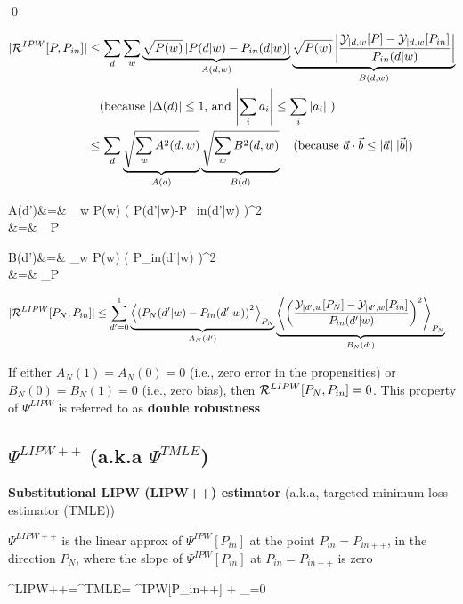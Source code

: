 \qed


\begin{align}
|{\cal R}^{IPW}[P,P_{in}]|&\leq
\sum_d \sum_w
\underbrace{\sqrt{P(w)}
\left|
P(d|w)-P_{in}(d|w)
\right|}_{A(d,w)}
\underbrace{\sqrt{P(w)}
\left|
\frac{
{\cal Y}_{|d,w}[P]-{\cal Y}_{|d,w}[P_{in}]}
{P_{in}(d|w)}
\right|}_{B(d,w)}
\nonumber
\\&
\quad\text{(because
$|\Delta(d)|\leq 1$, and $\left|\sum_i a_i\right|\leq \sum_i |a_i|$ )}
\\
&\leq
\sum_d
\underbrace{\sqrt{\sum_w A^2(d,w)}}_{A(d)}
\underbrace{\sqrt{\sum_w B^2(d,w)}}_{B(d)}
\quad \text{(because ${\vec{a}}\cdot {\vec{b}}\leq |{\vec{a}}|\;|{\vec{b}}|$)}
\end{align}

\beqa
A(d')&=&
\sum_w P(w)
\left(
P(d'|w)-P_{in}(d'|w)
\right)^2
\\
&=&
_P
\eeqa

\beqa
B(d')&=&
\sum_w P(w)
\left(
{P_{in}(d'|w)}
\right)^2
\\
&=&
_P
\eeqa

\begin{align}
|{\cal R}^{LIPW}[P_N,P_{in}]|&\leq
\sum_{d'=0}^1
\underbrace{
\left\langle
\left(
P_N(d'|w)-P_{in}(d'|w)
\right)^2
\right\rangle_{P_N}
}_{A_N(d')}
\underbrace{
\left\langle
\left(
\frac{
{\cal Y}_{|d',w}[P_N]-{\cal Y}_{|d',w}[P_{in}]}
{P_{in}(d'|w)}
\right)^2
\right\rangle_{P_N}
}_{B_N(d')}
\end{align}

If either $A_N(1)=A_N(0)=0$ (i.e.,
zero error in the propensities) or $B_N(0)=B_N(1)=0$ (i.e.,
zero bias),
then ${\cal R}^{LIPW}[P_N,P_{in}]=0$.
This property
of $\Psi^{LIPW}$ is referred to as {\bf double robustness}


\subsection{$\Psi^{LIPW++}$ (a.k.a $\Psi^{TMLE}$)}

{\bf Substitutional LIPW (LIPW++) estimator}
(a.k.a, targeted minimum loss estimator (TMLE))

$\Psi^{LIPW++}$ is the
linear approx of $\Psi^{IPW}[P_{in}]$ at the point $P_{in}=P_{in++}$,
in the direction $P_N$,
where the slope
of $\Psi^{IPW}[P_{in}]$ at $P_{in}=P_{in++}$ is zero

\beq
\Psi^{LIPW++}=\Psi^{TMLE}=
\Psi^{IPW}[P_{in++}] +
_{=0}
\eeq


